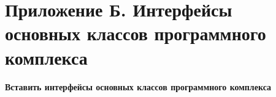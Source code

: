 \documentclass[a4paper,14pt]{article}
\makeatletter
\newcommand{\labelname}[1]{%
	\def\@currentlabelname{#1}}%
\makeatother
\begin{document}

\clearpage
{}
\section*{Приложение Б. Интерфейсы основных классов программного комплекса}
\labelname{Б}\label{app:interfaces}

{\color{red}\textbf{Вставить интерфейсы основных классов программного комплекса}}

\end{document}
